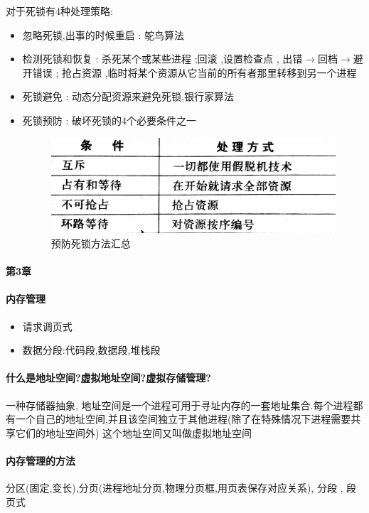\documentclass[UTF8,a4paper]{ctexart}
\begin{document}
对于死锁有4种处理策略:
\begin{itemize}
	\item 忽略死锁,出事的时候重启 : 鸵鸟算法
	\item 检测死锁和恢复 : 杀死某个或某些进程 ;回滚 ,设置检查点 , 出错$\to$回档$\to$避开错误 ; 抢占资源 ,临时将某个资源从它当前的所有者那里转移到另一个进程
	\item 死锁避免 : 动态分配资源来避免死锁,银行家算法
	\item 死锁预防 : 破坏死锁的4个必要条件之一
	\begin{figure}[H]
	\centering
	\includegraphics[scale = 0.1]{assets/ModernOperatingSystems_d2112.png}
	\caption{预防死锁方法汇总}
	\end{figure}
\end{itemize}

\paragraph{第3章}
\paragraph{内存管理}
\begin{itemize}
	\item 请求调页式
	\item 数据分段:代码段,数据段,堆栈段
\end{itemize}

\paragraph{什么是地址空间?虚拟地址空间?虚拟存储管理?}
一种存储器抽象, 地址空间是一个进程可用于寻址内存的一套地址集合.每个进程都有一个自己的地址空间,并且该空间独立于其他进程(除了在特殊情况下进程需要共享它们的地址空间外) 这个地址空间又叫做虚拟地址空间 

\paragraph{内存管理的方法}
分区(固定,变长),分页(进程地址分页,物理分页框,用页表保存对应关系), 分段 , 段页式
\end{document}
